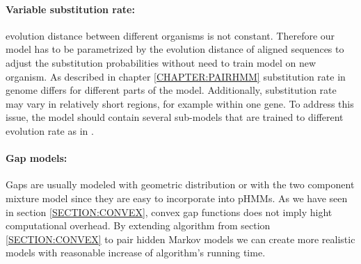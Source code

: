 \paragraph{Variable substitution rate:} evolution distance between different
organisms is not constant.  Therefore our model has to be parametrized by the
evolution distance of aligned sequences to adjust the substitution probabilities
without need to train model on new organism. As described in chapter
\ref{CHAPTER:PAIRHMM} substitution rate in genome differs for different parts of
the model.  Additionally, substitution rate may vary in relatively short
regions, for example within one gene.  To address this issue, the model should
contain several sub-models that are trained to different evolution rate as in
\cite{Hudek2010}.

\paragraph{Gap models:} Gaps are usually modeled with geometric distribution
or with the two component mixture model since they are easy to incorporate into 
pHMMs. As we have seen in section \ref{SECTION:CONVEX}, convex gap functions
does not imply hight computational overhead. By extending algorithm from section
\ref{SECTION:CONVEX} to pair hidden Markov models we can create more realistic
models with reasonable increase of algorithm's running time.


\label{LastPage}

